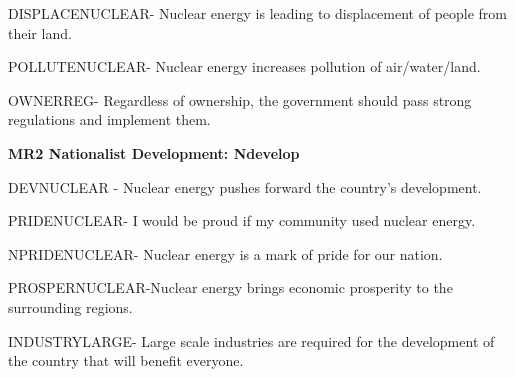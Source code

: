 \documentclass[
]{article}
\begin{document}
DISPLACENUCLEAR- Nuclear energy is leading to displacement of people
from their land.

POLLUTENUCLEAR- Nuclear energy increases pollution of air/water/land.

OWNERREG- Regardless of ownership, the government should pass strong
regulations and implement them.

\textbf{MR2 Nationalist Development: Ndevelop}

DEVNUCLEAR - Nuclear energy pushes forward the country's development.

PRIDENUCLEAR- I would be proud if my community used nuclear energy.

NPRIDENUCLEAR- Nuclear energy is a mark of pride for our nation.

PROSPERNUCLEAR-Nuclear energy brings economic prosperity to the
surrounding regions.

INDUSTRYLARGE- Large scale industries are required for the development
of the country that will benefit everyone.
\end{document}
